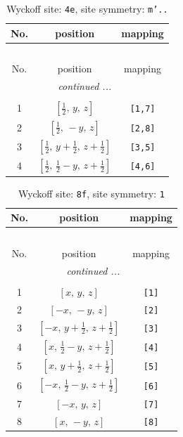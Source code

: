 \documentclass[fleqn,8pt]{jsarticle}
\begin{document}
\renewcommand{\arraystretch}{1.2}
\begin{longtable}{ccc}
\caption{Wyckoff site: {\tt 4e}, site symmetry: {\tt m'..}}
 \\
 \hline \hline
No. & position & mapping \\ \hline \endfirsthead

\multicolumn{2}{l}{\tablename\ \thetable{}} \\
 \hline \hline
No. & position & mapping \\ \hline \endhead

 \hline \hline
\multicolumn{2}{r}{\footnotesize\it continued ...} \\ \endfoot

 \hline \hline
\multicolumn{2}{r}{} \\ \endlastfoot

1 & $\left[ \frac{1}{2},\, y,\, z \right]$ & {\tt [1,7]} \\ \hline
2 & $\left[ \frac{1}{2},\, - y,\, z \right]$ & {\tt [2,8]} \\ \hline
3 & $\left[ \frac{1}{2},\, y + \frac{1}{2},\, z + \frac{1}{2} \right]$ & {\tt [3,5]} \\ \hline
4 & $\left[ \frac{1}{2},\, \frac{1}{2} - y,\, z + \frac{1}{2} \right]$ & {\tt [4,6]} \\
\end{longtable}
\renewcommand{\arraystretch}{1.2}
\begin{longtable}{ccc}
\caption{Wyckoff site: {\tt 8f}, site symmetry: {\tt 1}}
 \\
 \hline \hline
No. & position & mapping \\ \hline \endfirsthead

\multicolumn{2}{l}{\tablename\ \thetable{}} \\
 \hline \hline
No. & position & mapping \\ \hline \endhead

 \hline \hline
\multicolumn{2}{r}{\footnotesize\it continued ...} \\ \endfoot

 \hline \hline
\multicolumn{2}{r}{} \\ \endlastfoot

1 & $\left[ x,\, y,\, z \right]$ & {\tt [1]} \\ \hline
2 & $\left[ - x,\, - y,\, z \right]$ & {\tt [2]} \\ \hline
3 & $\left[ - x,\, y + \frac{1}{2},\, z + \frac{1}{2} \right]$ & {\tt [3]} \\ \hline
4 & $\left[ x,\, \frac{1}{2} - y,\, z + \frac{1}{2} \right]$ & {\tt [4]} \\ \hline
5 & $\left[ x,\, y + \frac{1}{2},\, z + \frac{1}{2} \right]$ & {\tt [5]} \\ \hline
6 & $\left[ - x,\, \frac{1}{2} - y,\, z + \frac{1}{2} \right]$ & {\tt [6]} \\ \hline
7 & $\left[ - x,\, y,\, z \right]$ & {\tt [7]} \\ \hline
8 & $\left[ x,\, - y,\, z \right]$ & {\tt [8]} \\
\end{longtable}
\end{document}
